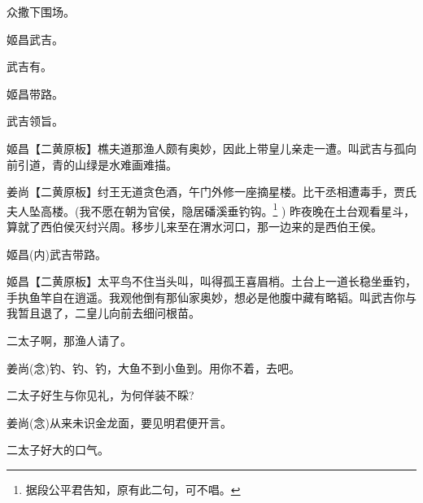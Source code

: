 {众\hspace{41pt}撒下围场。

姬昌\hspace{30pt}武吉。

武吉\hspace{30pt}有。

姬昌\hspace{30pt}带路。

武吉\hspace{30pt}领旨。

\setlength{\hangindent}{52pt}   %
{姬昌\hspace{30pt}【{\akai 二黄原板}】樵夫道那渔人颇有奥妙，因此上带皇儿亲走一遭。叫武吉与孤向前引道，青的山绿是水难画难描。}

\vspace{5pt}

\setlength{\hangindent}{52pt}   %
{姜尚\hspace{30pt}【{\akai 二黄原板}】纣王无道贪色酒，午门外修一座摘星楼。比干丞相遭毒手，贾氏夫人坠高楼。(我不愿在朝为官侯，隐居磻溪垂钓钩。\footnote{据段公平{\scriptsize 君}告知，原有此二句，可不唱。}%
) 昨夜晚在土台观看星斗，算就了西伯侯灭纣兴周。移步儿来至在渭水河口，那一边来的是西伯王侯。}

姬昌\hspace{30pt}({\akai 内})武吉带路。

\setlength{\hangindent}{52pt}   %
{姬昌\hspace{30pt}【{\akai 二黄原板}】太平鸟不住当头叫，叫得孤王喜眉梢。土台上一道长稳坐垂钓，手执鱼竿自在逍遥。我观他倒有那仙家奥妙，想必是他腹中藏有略韬。叫武吉你与我暂且退了，二皇儿向前去细问根苗。}

{\akai 二}太子\hspace{20pt}啊，那渔人请了。

姜尚\hspace{30pt}({\akai 念})钓、钓、钓，大鱼不到小鱼到。用你不着，去吧。

{\akai 二}太子\hspace{20pt}好生与你见礼，为何佯装不睬?

姜尚\hspace{30pt}({\akai 念})从来未识金龙面，要见明君便开言。

{\akai 二}太子\hspace{20pt}好大的口气。

}
